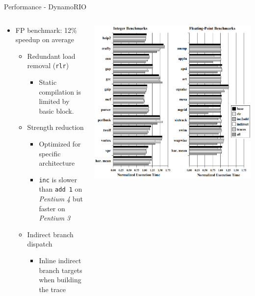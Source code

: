 \documentclass[aspectratio=169,xcolor=x11names]{beamer}
\begin{document}
	\begin{frame}{Performance - DynamoRIO}
		\begin{columns}
			\begin{column}{0.45\linewidth}
				\begin{itemize}
					\item FP benchmark: 12\% speedup on average
					\begin{itemize}
						\item Redundant load removal (\texttt{rlr})
						\begin{itemize}
							\item Static compilation is limited by basic block.
						\end{itemize}
						\item Strength reduction
						\begin{itemize}
							\item Optimized for specific architecture
							\item \texttt{inc} is slower than \texttt{add 1} on \textit{Pentium 4} but faster on \textit{Pentium 3}
						\end{itemize}
						\item Indirect branch dispatch
						\begin{itemize}
							\item Inline indirect branch targets when building the trace
						\end{itemize}
					\end{itemize}
				\end{itemize}
			\end{column}
			\begin{column}{0.55\linewidth}
				\includegraphics[width=\textwidth]{DynamoRIO-speedup}
			\end{column}
		\end{columns}
	\end{frame}
\end{document}

